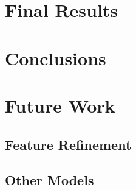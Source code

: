 \documentclass{article}
\begin{document}
\section{Final Results}

\pagebreak

\section{Conclusions}

\section{Future Work}

\subsection{Feature Refinement}

\subsection{Other Models}


%
%
\end{document}
